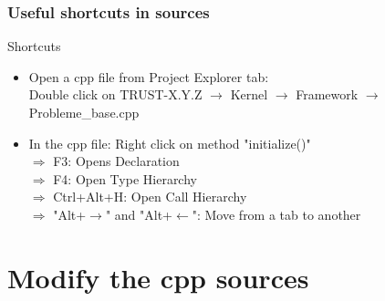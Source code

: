 \documentclass[10pt, hyperref={unicode=true,pdfusetitle, bookmarks=true,bookmarksnumbered=false,bookmarksopen=false, breaklinks=false,pdfborder={0 0 1},backref=true,colorlinks=true,linkcolor=darkblue,pageanchor, urlcolor=darkblue}]{beamer}
\begin{document}
\begin{frame}
\frametitle{Useful shortcuts in sources}

\begin{exampleblock}{Shortcuts}
\vspace{0.2cm}
\begin{itemize} 
\item Open a cpp file from Project Explorer tab: \\
  Double click on TRUST-X.Y.Z $\rightarrow$ Kernel $\rightarrow$ Framework $\rightarrow$ Probleme\_base.cpp \\ \vspace{0.2cm}
\item In the cpp file: Right click on method "initialize()" \\
  $\Rightarrow$ F3: Opens Declaration \\
  $\Rightarrow$ F4: Open Type Hierarchy \\
  $\Rightarrow$ Ctrl+Alt+H: Open Call Hierarchy \\
  $\Rightarrow$ "Alt+$\rightarrow$" and "Alt+$\leftarrow$": Move from a tab to another
\end{itemize}
\end{exampleblock}

\end{frame}


\section{{\bf{Modify the cpp sources}}}
\end{document}
